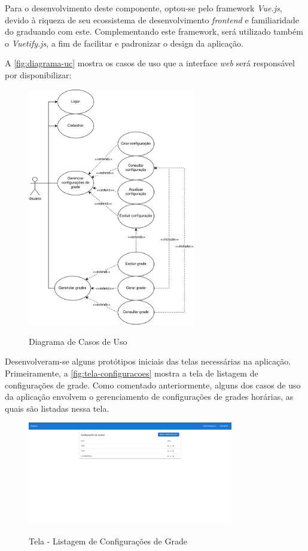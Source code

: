 Para o desenvolvimento deste componente, optou-se pelo framework \textit{Vue.js}, devido à riqueza de seu ecossistema de desenvolvimento \textit{frontend} e familiaridade do graduando com este. Complementando este framework, será utilizado também o \textit{Vuetify.js}, a fim de facilitar e padronizar o design da aplicação.

A \autoref{fig:diagrama-uc} mostra os casos de uso que a interface \textit{web} será responsável por disponibilizar:

\begin{figure}[!htb]
	\centering
	\caption{Diagrama de Casos de Uso}
	\includegraphics[width=0.65\textwidth]{./dados/figuras/diagrama_uc}
	\label{fig:diagrama-uc}
\end{figure}
\newpage

Desenvolveram-se alguns protótipos iniciais das telas necessárias na aplicação.
Primeiramente, a \autoref{fig:tela-configuracoes} mostra a tela de listagem de configurações de grade. Como comentado anteriormente, alguns dos casos de uso da aplicação envolvem o gerenciamento de configurações de grades horárias, as quais são listadas nessa tela.

\begin{figure}[!htb]
	\centering
	\caption{Tela - Listagem de Configurações de Grade}
	\includegraphics[width=0.8\textwidth]{./dados/figuras/tela_configuracoes}
	\label{fig:tela-configuracoes}
\end{figure}

